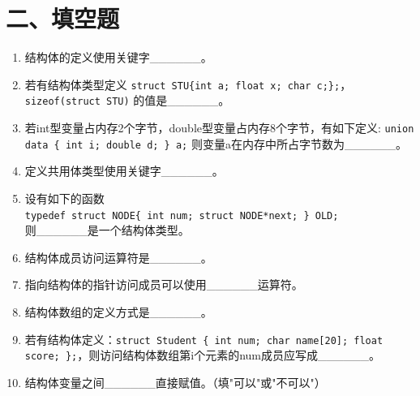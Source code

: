 \documentclass[a4paper,12pt]{article}
\begin{document}
\section*{二、填空题}

\begin{enumerate}
	\item 结构体的定义使用关键字\_\_\_\_\_\_。
	      \vspace{0.3cm}

	\item 若有结构体类型定义 \texttt{struct STU\{int a; float x; char c;\};}，\texttt{sizeof(struct STU)} 的值是\_\_\_\_\_\_。
	      \vspace{0.3cm}

	\item 若int型变量占内存2个字节，double型变量占内存8个字节，有如下定义: \texttt{union data \{ int i; double d; \} a;} 则变量a在内存中所占字节数为\_\_\_\_\_\_。
	      \vspace{0.3cm}

	\item 定义共用体类型使用关键字\_\_\_\_\_\_。
	      \vspace{0.3cm}

	\item 设有如下的函数\\
	      \texttt{typedef struct NODE\{ int num; struct NODE*next; \} OLD;}\\
	      则\_\_\_\_\_\_是一个结构体类型。
	      \vspace{0.3cm}

	\item 结构体成员访问运算符是\_\_\_\_\_\_。
	      \vspace{0.3cm}

	\item 指向结构体的指针访问成员可以使用\_\_\_\_\_\_运算符。
	      \vspace{0.3cm}

	\item 结构体数组的定义方式是\_\_\_\_\_\_。
	      \vspace{0.3cm}

	\item 若有结构体定义：\texttt{struct Student \{ int num; char name[20]; float score; \};}，则访问结构体数组第i个元素的num成员应写成\_\_\_\_\_\_。
	      \vspace{0.3cm}

	\item 结构体变量之间\_\_\_\_\_\_直接赋值。（填"可以"或"不可以"）
	      \vspace{0.3cm}


\end{enumerate}
\end{document}
